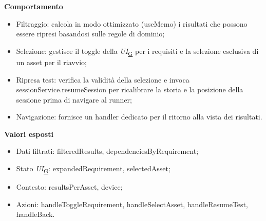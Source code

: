 \documentclass[a4paper,12pt]{article}
\begin{document}
                \textbf{Comportamento}
                \begin{itemize}
                    \item Filtraggio: calcola in modo ottimizzato ({\ttfamily useMemo}) i risultati che possono essere ripresi basandosi sulle regole di dominio;
                    \item Selezione: gestisce il toggle della \textit{UI}\textsubscript{\href{https://atlasteam9.github.io/Atlas/glossario.html\#UI}{G}} per i requisiti e la selezione esclusiva di un asset per il riavvio;
                    \item Ripresa test: verifica la validità della selezione e invoca {\ttfamily sessionService.resumeSession} per ricalibrare la storia e la posizione della sessione prima di navigare al runner;
                    \item Navigazione: fornisce un handler dedicato per il ritorno alla vista dei risultati.
                \end{itemize}
                \textbf{Valori esposti}
                \begin{itemize}
                    \item Dati filtrati: {\ttfamily filteredResults}, {\ttfamily dependenciesByRequirement};
                    \item Stato \textit{UI}\textsubscript{\href{https://atlasteam9.github.io/Atlas/glossario.html\#UI}{G}}: {\ttfamily expandedRequirement}, {\ttfamily selectedAsset};
                    \item Contesto: {\ttfamily resultsPerAsset}, {\ttfamily device};
                    \item Azioni: {\ttfamily handleToggleRequirement}, {\ttfamily handleSelectAsset}, {\ttfamily handleResumeTest}, {\ttfamily handleBack}.
                \end{itemize}
                
\end{document}
